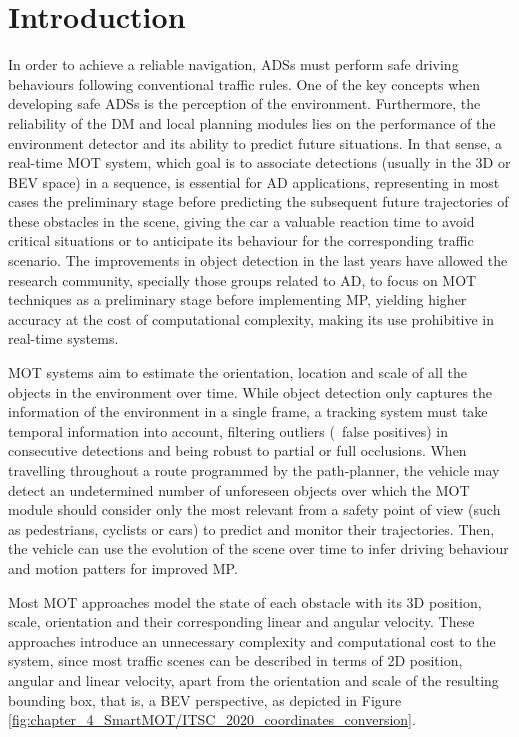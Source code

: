 \section{Introduction}
\label{sec:4_introduction}

In order to achieve a reliable navigation, \acfp{ADS} must perform safe driving behaviours following conventional traffic rules. One of the key concepts when developing safe \acp{ADS} is the perception of the environment. Furthermore, the reliability of the \ac{DM} and local planning modules lies on the performance of the environment detector and its ability to predict future situations. In that sense, a real-time \ac{MOT} system, which goal is to associate detections (usually in the 3D or \ac{BEV} space) in a sequence, is essential for \ac{AD} applications, representing in most cases the preliminary stage before predicting the subsequent future trajectories of these obstacles in the scene, giving the car a valuable reaction time to avoid critical situations or to anticipate its behaviour for the corresponding traffic scenario. The improvements in object detection in the last years have allowed the research community, specially those groups related to \ac{AD}, to focus on \ac{MOT} techniques as a preliminary stage before implementing \ac{MP}, yielding higher accuracy at the cost of computational complexity, making its use prohibitive in real-time systems. 

\ac{MOT} systems aim to estimate the orientation, location and scale of all the objects in the environment over time. While object detection only captures the information of the environment in a single frame, a tracking system must take temporal information into account, filtering outliers (\aka \ false positives) in consecutive detections and being robust to partial or full occlusions. When travelling throughout a route programmed by the path-planner, the vehicle may detect an undetermined number of unforeseen objects over which the \ac{MOT} module should consider only the most relevant from a safety point of view (such as pedestrians, cyclists or cars) to predict and monitor their trajectories. Then, the vehicle can use the evolution of the scene over time to infer driving behaviour and motion patters for improved \ac{MP}.

Most \ac{MOT} approaches \cite{weng20203d, chiu2021probabilistic} model the state of each obstacle with its 3D position, scale, orientation and their corresponding linear and angular velocity. These approaches introduce an unnecessary complexity and computational cost to the system, since most traffic scenes can be described in terms of 2D position, angular and linear velocity, apart from the orientation and scale of the resulting bounding box, that is, a \ac{BEV} perspective, as depicted in Figure \ref{fig:chapter_4_SmartMOT/ITSC_2020_coordinates_conversion}. 

